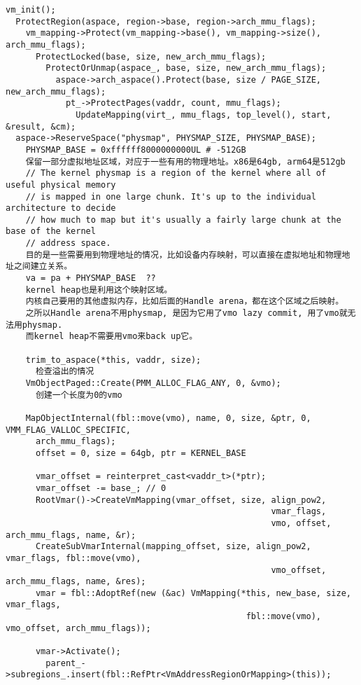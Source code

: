 \begin{verbatim}
vm_init();
  ProtectRegion(aspace, region->base, region->arch_mmu_flags);
    vm_mapping->Protect(vm_mapping->base(), vm_mapping->size(), arch_mmu_flags);
      ProtectLocked(base, size, new_arch_mmu_flags);
        ProtectOrUnmap(aspace_, base, size, new_arch_mmu_flags);
          aspace->arch_aspace().Protect(base, size / PAGE_SIZE, new_arch_mmu_flags);
            pt_->ProtectPages(vaddr, count, mmu_flags);
              UpdateMapping(virt_, mmu_flags, top_level(), start, &result, &cm);
  aspace->ReserveSpace("physmap", PHYSMAP_SIZE, PHYSMAP_BASE);
    PHYSMAP_BASE = 0xffffff8000000000UL # -512GB
    保留一部分虚拟地址区域，对应于一些有用的物理地址。x86是64gb, arm64是512gb
    // The kernel physmap is a region of the kernel where all of useful physical memory
    // is mapped in one large chunk. It's up to the individual architecture to decide
    // how much to map but it's usually a fairly large chunk at the base of the kernel
    // address space.
    目的是一些需要用到物理地址的情况，比如设备内存映射，可以直接在虚拟地址和物理地址之间建立关系。
    va = pa + PHYSMAP_BASE  ??
    kernel heap也是利用这个映射区域。
    内核自己要用的其他虚拟内存，比如后面的Handle arena，都在这个区域之后映射。
    之所以Handle arena不用physmap, 是因为它用了vmo lazy commit, 用了vmo就无法用physmap.
    而kernel heap不需要用vmo来back up它。

    trim_to_aspace(*this, vaddr, size);
      检查溢出的情况
    VmObjectPaged::Create(PMM_ALLOC_FLAG_ANY, 0, &vmo);  
      创建一个长度为0的vmo

    MapObjectInternal(fbl::move(vmo), name, 0, size, &ptr, 0, VMM_FLAG_VALLOC_SPECIFIC,
      arch_mmu_flags);
      offset = 0, size = 64gb, ptr = KERNEL_BASE

      vmar_offset = reinterpret_cast<vaddr_t>(*ptr);
      vmar_offset -= base_; // 0
      RootVmar()->CreateVmMapping(vmar_offset, size, align_pow2,
                                                     vmar_flags,
                                                     vmo, offset, arch_mmu_flags, name, &r);
      CreateSubVmarInternal(mapping_offset, size, align_pow2, vmar_flags, fbl::move(vmo),
                                                     vmo_offset, arch_mmu_flags, name, &res);
      vmar = fbl::AdoptRef(new (&ac) VmMapping(*this, new_base, size, vmar_flags,
                                                fbl::move(vmo), vmo_offset, arch_mmu_flags));
      
      vmar->Activate();
        parent_->subregions_.insert(fbl::RefPtr<VmAddressRegionOrMapping>(this));
      

\end{verbatim}
